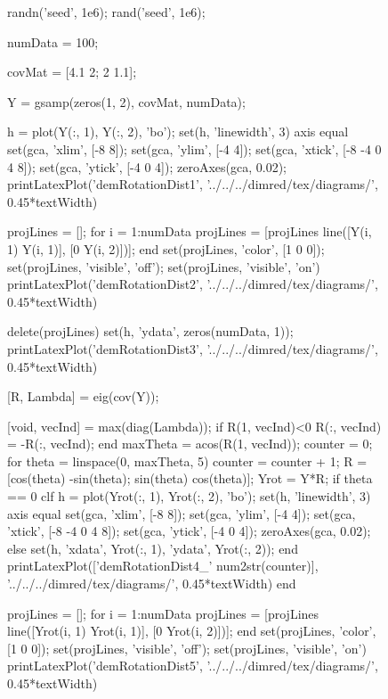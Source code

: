 \begin{figure}
  \begin{octave}
    randn('seed', 1e6);
    rand('seed', 1e6);

    numData = 100;

    covMat = [4.1 2; 2 1.1];


    Y = gsamp(zeros(1, 2), covMat, numData);

    h = plot(Y(:, 1), Y(:, 2), 'bo');
    set(h, 'linewidth', 3)
    axis equal
    set(gca, 'xlim', [-8 8]);
    set(gca, 'ylim', [-4 4]);
    set(gca, 'xtick', [-8 -4 0 4 8]);
    set(gca, 'ytick', [-4 0 4]);
    zeroAxes(gca, 0.02);
    printLatexPlot('demRotationDist1', '../../../dimred/tex/diagrams/', 0.45*textWidth)

    projLines = [];
    for i = 1:numData
      projLines = [projLines line([Y(i, 1) Y(i, 1)], [0 Y(i, 2)])];
    end
    set(projLines, 'color', [1 0 0]);
    set(projLines, 'visible', 'off');
    set(projLines, 'visible', 'on')
    printLatexPlot('demRotationDist2', '../../../dimred/tex/diagrams/', 0.45*textWidth)

    delete(projLines)
    set(h, 'ydata', zeros(numData, 1));
    printLatexPlot('demRotationDist3', '../../../dimred/tex/diagrams/', 0.45*textWidth)

    [R, Lambda] = eig(cov(Y));

    [void, vecInd] = max(diag(Lambda));
    if R(1, vecInd)<0
      R(:, vecInd) = -R(:, vecInd);
    end
    maxTheta = acos(R(1, vecInd));
    counter = 0;
    for theta = linspace(0, maxTheta, 5)
      counter = counter + 1;
      R = [cos(theta) -sin(theta); sin(theta) cos(theta)];
      Yrot = Y*R;
      if theta == 0
        clf
        h = plot(Yrot(:, 1), Yrot(:, 2), 'bo');
        set(h, 'linewidth', 3)
        axis equal
        set(gca, 'xlim', [-8 8]);
        set(gca, 'ylim', [-4 4]);
        set(gca, 'xtick', [-8 -4 0 4 8]);
        set(gca, 'ytick', [-4 0 4]);
        zeroAxes(gca, 0.02);
      else
        set(h, 'xdata', Yrot(:, 1), 'ydata', Yrot(:, 2));
      end
      printLatexPlot(['demRotationDist4_' num2str(counter)], '../../../dimred/tex/diagrams/', 0.45*textWidth)
    end

    projLines = [];
    for i = 1:numData
      projLines = [projLines line([Yrot(i, 1) Yrot(i, 1)], [0 Yrot(i, 2)])];
    end
    set(projLines, 'color', [1 0 0]);
    set(projLines, 'visible', 'off');
    set(projLines, 'visible', 'on')
    printLatexPlot('demRotationDist5', '../../../dimred/tex/diagrams/', 0.45*textWidth)


\end{octave}
\end{figure}
